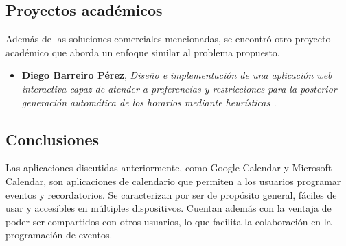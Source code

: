 \subsection{Proyectos académicos}

Además de las soluciones comerciales mencionadas, se encontró otro proyecto académico que aborda un enfoque similar al problema propuesto.

\begin{itemize}
    \item \textbf{Diego Barreiro Pérez}, \textit{Diseño e implementación de una aplicación web interactiva capaz de atender a preferencias y restricciones para la posterior generación automática de los horarios mediante heurísticas \cite{Barreiro}.}
\end{itemize}




\newpage
\subsection{Conclusiones}
Las aplicaciones discutidas anteriormente, como Google Calendar y Microsoft Calendar, son aplicaciones de calendario que permiten a los usuarios programar eventos y recordatorios. Se caracterizan por ser de propósito general, fáciles de usar y accesibles en múltiples dispositivos. Cuentan además con la ventaja de poder ser compartidos con otros usuarios, lo que facilita la colaboración en la programación de eventos.\newline

